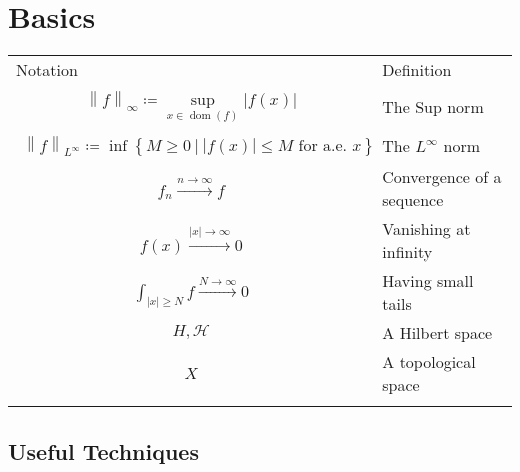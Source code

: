 \hypertarget{basics}{%
\section{Basics}\label{basics}}

\begin{longtable}[]{@{}
  >{\raggedright\arraybackslash}p{}
  >{\raggedright\arraybackslash}p{}@{}}
\toprule
Notation & Definition \\ \addlinespace
\midrule
\endhead
\begin{align*}{\left\lVert {f} \right\rVert}_\infty \coloneqq\sup_{x\in \operatorname{dom}(f)} {\left\lvert {f(x)} \right\rvert}\end{align*}
& The Sup norm \\ \addlinespace
\begin{align*} {\left\lVert {f} \right\rVert}_{L^\infty} \coloneqq\inf\left\{{M \geq 0 {~\mathrel{\Big|}~}{\left\lvert {f(x)} \right\rvert} \leq M \text{ for a.e. } x }\right\} \end{align*}
& The \(L^ \infty\) norm \\ \addlinespace
\begin{align*} f_n \overset{n \to \infty }\to f \end{align*}
& Convergence of a sequence \\ \addlinespace
\begin{align*} f(x) \overset{{\left\lvert {x} \right\rvert} \to \infty}\to 0 \end{align*}
& Vanishing at infinity \\ \addlinespace
\begin{align*} \int_{{\left\lvert {x} \right\rvert} \geq N} f \overset{N\to \infty}\to 0 \end{align*}
& Having small tails \\ \addlinespace
\begin{align*} H, \mathcal{H} \end{align*}
& A Hilbert space \\ \addlinespace
\begin{align*} X \end{align*}
& A topological space \\ \addlinespace
\bottomrule
\end{longtable}

\hypertarget{useful-techniques}{%
\subsection{Useful Techniques}\label{useful-techniques}}

